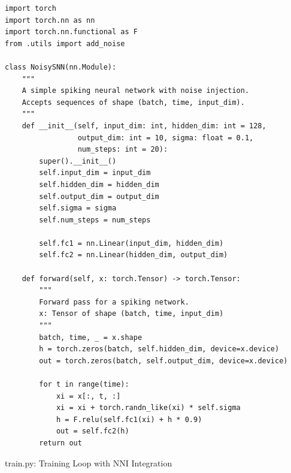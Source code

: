 \begin{lstlisting}
import torch
import torch.nn as nn
import torch.nn.functional as F
from .utils import add_noise

class NoisySNN(nn.Module):
    """
    A simple spiking neural network with noise injection.
    Accepts sequences of shape (batch, time, input_dim).
    """
    def __init__(self, input_dim: int, hidden_dim: int = 128, 
                 output_dim: int = 10, sigma: float = 0.1, 
                 num_steps: int = 20):
        super().__init__()
        self.input_dim = input_dim
        self.hidden_dim = hidden_dim
        self.output_dim = output_dim
        self.sigma = sigma
        self.num_steps = num_steps

        self.fc1 = nn.Linear(input_dim, hidden_dim)
        self.fc2 = nn.Linear(hidden_dim, output_dim)

    def forward(self, x: torch.Tensor) -> torch.Tensor:
        """
        Forward pass for a spiking network.
        x: Tensor of shape (batch, time, input_dim)
        """
        batch, time, _ = x.shape
        h = torch.zeros(batch, self.hidden_dim, device=x.device)
        out = torch.zeros(batch, self.output_dim, device=x.device)

        for t in range(time):
            xi = x[:, t, :]
            xi = xi + torch.randn_like(xi) * self.sigma
            h = F.relu(self.fc1(xi) + h * 0.9)
            out = self.fc2(h)
        return out
\end{lstlisting}

train.py: Training Loop with NNI Integration

